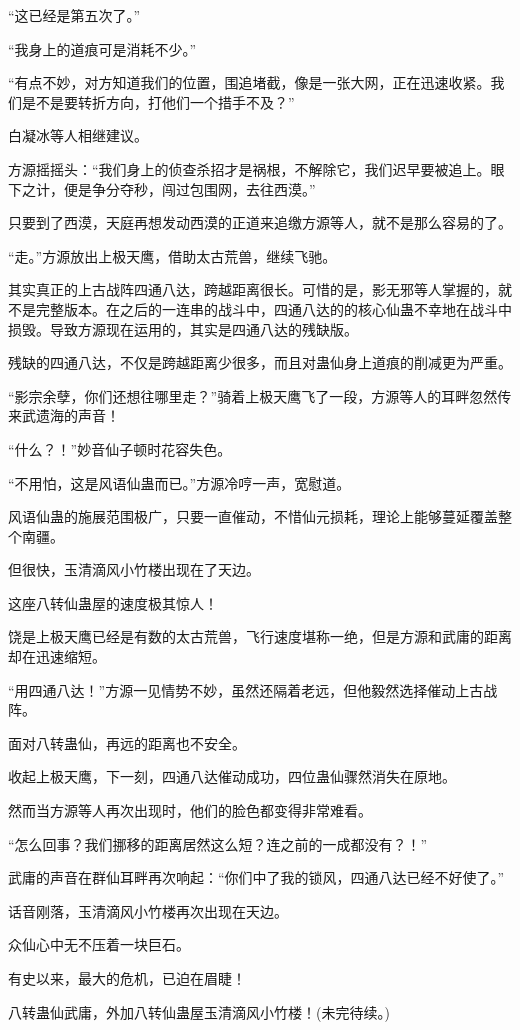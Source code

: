 \begin{this_body}
“这已经是第五次了。”

“我身上的道痕可是消耗不少。”

“有点不妙，对方知道我们的位置，围追堵截，像是一张大网，正在迅速收紧。我们是不是要转折方向，打他们一个措手不及？”

白凝冰等人相继建议。

方源摇摇头：“我们身上的侦查杀招才是祸根，不解除它，我们迟早要被追上。眼下之计，便是争分夺秒，闯过包围网，去往西漠。”

只要到了西漠，天庭再想发动西漠的正道来追缴方源等人，就不是那么容易的了。

“走。”方源放出上极天鹰，借助太古荒兽，继续飞驰。

其实真正的上古战阵四通八达，跨越距离很长。可惜的是，影无邪等人掌握的，就不是完整版本。在之后的一连串的战斗中，四通八达的的核心仙蛊不幸地在战斗中损毁。导致方源现在运用的，其实是四通八达的残缺版。

残缺的四通八达，不仅是跨越距离少很多，而且对蛊仙身上道痕的削减更为严重。

“影宗余孽，你们还想往哪里走？”骑着上极天鹰飞了一段，方源等人的耳畔忽然传来武遗海的声音！

“什么？！”妙音仙子顿时花容失色。

“不用怕，这是风语仙蛊而已。”方源冷哼一声，宽慰道。

风语仙蛊的施展范围极广，只要一直催动，不惜仙元损耗，理论上能够蔓延覆盖整个南疆。

但很快，玉清滴风小竹楼出现在了天边。

这座八转仙蛊屋的速度极其惊人！

饶是上极天鹰已经是有数的太古荒兽，飞行速度堪称一绝，但是方源和武庸的距离却在迅速缩短。

“用四通八达！”方源一见情势不妙，虽然还隔着老远，但他毅然选择催动上古战阵。

面对八转蛊仙，再远的距离也不安全。

收起上极天鹰，下一刻，四通八达催动成功，四位蛊仙骤然消失在原地。

然而当方源等人再次出现时，他们的脸色都变得非常难看。

“怎么回事？我们挪移的距离居然这么短？连之前的一成都没有？！”

武庸的声音在群仙耳畔再次响起：“你们中了我的锁风，四通八达已经不好使了。”

话音刚落，玉清滴风小竹楼再次出现在天边。

众仙心中无不压着一块巨石。

有史以来，最大的危机，已迫在眉睫！

八转蛊仙武庸，外加八转仙蛊屋玉清滴风小竹楼！(未完待续。)

\end{this_body}

